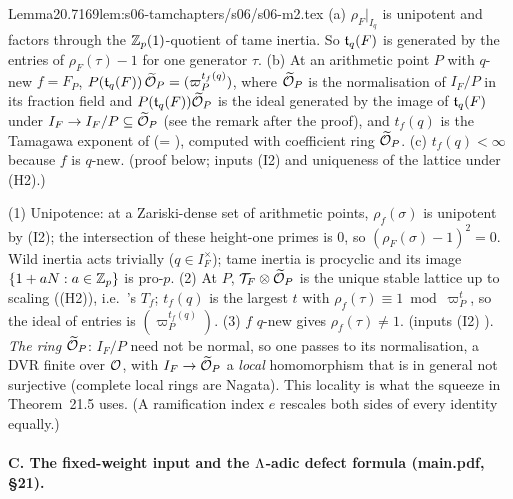 \begin{quoted}{Lemma}{20.7}{169}{lem:s06-tam}{}{chapters/s06/s06-m2.tex}\label{rpt:lem:s06-tam}
(a) $\rho_F|_{I_q}$ is unipotent and factors through the $\mathbb{Z}_p(1)$-quotient of tame inertia. So $\mathfrak{t}_q(F)$ is generated by the
entries of $\rho_F(\tau)-1$ for one generator $\tau$. (b) At an arithmetic point $P$ with $q$-new $f=F_P$,
$P(\mathfrak{t}_q(F))\,\widetilde{\mathcal{O}}_P=(\varpi_P^{t_f(q)})$, where $\widetilde{\mathcal{O}}_P$ is the normalisation of $I_F/P$ in its fraction field and $P(\mathfrak{t}_q(F))\widetilde{\mathcal{O}}_P$ is the ideal generated by the image of $\mathfrak{t}_q(F)$ under $I_F\to I_F/P\subseteq\widetilde{\mathcal{O}}_P$ (see the remark after the proof), and $t_f(q)$ is the Tamagawa exponent of
\cite[Def.~2.12]{KO} \cite[Def.~2.12,
p.~6]{KO} (= \cite[Def.~3.3]{PW} \cite[Def.~3.3, p.~9]{PW}),
computed with coefficient ring $\widetilde{\mathcal{O}}_P$. (c) $t_f(q)<\infty$ because $f$ is $q$-new. \stpmc{} (proof below; inputs (I2) and
uniqueness of the lattice under (H2).)
\end{quoted}
\begin{outline}
(1) Unipotence: at a Zariski-dense set of arithmetic points, $\rho_f(\sigma)$ is unipotent by (I2); the intersection of these height-one
primes is $0$, so $(\rho_F(\sigma)-1)^2=0$. Wild inertia acts trivially ($q\in I_F^\times$); tame inertia is procyclic and its image
$\{1+aN:a\in\mathbb{Z}_p\}$ is pro-$p$. (2) At $P$, $\mathcal T_F\otimes\widetilde{\mathcal{O}}_P$ is the unique stable lattice up to scaling ((H2)), i.e.\
\cite{KO}'s $T_f$; $t_f(q)$ is the largest $t$ with $\rho_f(\tau)\equiv1\bmod\varpi_P^t$, so the ideal of entries is $(\varpi_P^{t_f(q)})$.
(3) $f$ $q$-new gives $\rho_f(\tau)\ne1$. \stpmc{} (inputs (I2) \stcited). \emph{The ring $\widetilde{\mathcal{O}}_P$}: $I_F/P$ need not be normal, so one
passes to its normalisation, a DVR finite over $\mathcal{O}$, with $I_F\to\widetilde{\mathcal{O}}_P$ a \emph{local} homomorphism that is in general not surjective
(complete local rings are Nagata). This locality is what the squeeze in Theorem~21.5 uses. (A ramification index $e$ rescales both sides
of every identity equally.)
\end{outline}

\paragraph{C. The fixed-weight input and the $\Lambda$-adic defect formula (main.pdf, \S21).}

